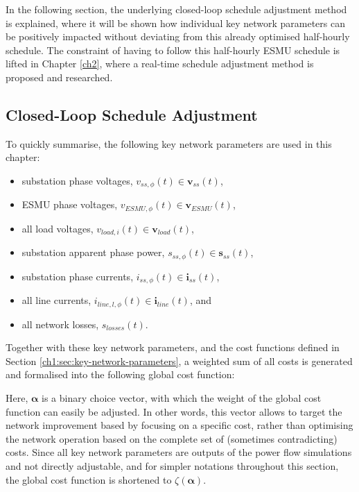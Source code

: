 In the following section, the underlying closed-loop schedule adjustment method is explained, where it will be shown how individual key network parameters can be positively impacted without deviating from this already optimised half-hourly schedule.
The constraint of having to follow this half-hourly ESMU schedule is lifted in Chapter \ref{ch2}, where a real-time schedule adjustment method is proposed and researched.

\subsection{Closed-Loop Schedule Adjustment}

To quickly summarise, the following key network parameters are used in this chapter:

\begin{itemize}
	\item substation phase voltages, $v_{ss,\phi}(t) \in \textbf{v}_{ss}(t)$,
	\item ESMU phase voltages, $v_{ESMU,\phi}(t) \in \textbf{v}_{ESMU}(t)$,
	\item all load voltages, $v_{load,i}(t) \in \textbf{v}_{load}(t)$,
	\item substation apparent phase power, $s_{ss,\phi}(t) \in \textbf{s}_{ss}(t)$,
	\item substation phase currents, $i_{ss,\phi}(t) \in \textbf{i}_{ss}(t)$,
	\item all line currents, $i_{line,l,\phi}(t) \in \textbf{i}_{line}(t)$, and
	\item all network losses, $s_{losses}(t)$.
\end{itemize}

Together with these key network parameters, and the cost functions defined in Section \ref{ch1:sec:key-network-parameters}, a weighted sum of all costs is generated and formalised into the following global cost function:



Here, $\boldsymbol{\alpha}$ is a binary choice vector, with which the weight of the global cost function can easily be adjusted.
In other words, this vector allows to target the network improvement based by focusing on a specific cost, rather than optimising the network operation based on the complete set of (sometimes contradicting) costs.
Since all key network parameters are outputs of the power flow simulations and not directly adjustable, and for simpler notations throughout this section, the global cost function is shortened to $\zeta(\boldsymbol{\alpha})$.

